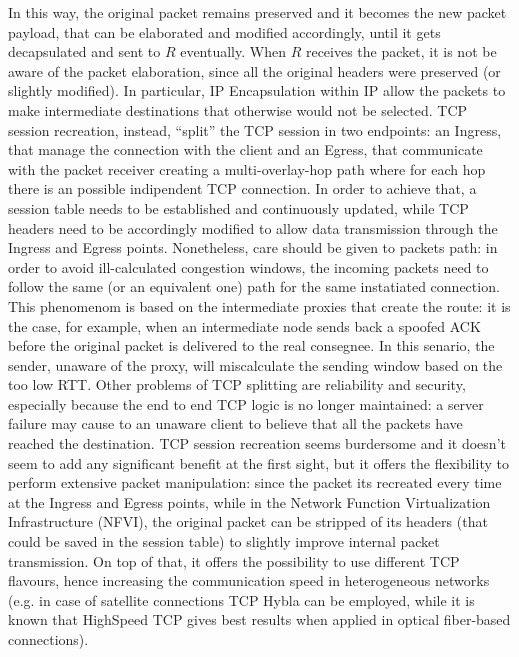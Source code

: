 \documentclass[10pt]{book}
\begin{document}
In this way, the original packet remains preserved and it becomes the new packet
payload, that can be elaborated and modified accordingly, until it gets
decapsulated and sent to $R$ eventually. When $R$ receives the packet, it is not
be aware of the packet elaboration, since all the original headers were
preserved (or slightly modified). In particular, IP Encapsulation within IP
allow the packets to make intermediate destinations that otherwise would not be
selected. TCP session recreation, instead, ``split'' the TCP session in two
endpoints: an Ingress, that manage the connection with the client and an Egress,
that communicate with the packet receiver creating a multi-overlay-hop path
where for each hop there is an possible indipendent TCP connection. In order to
achieve that, a session table needs to be established and continuously updated,
while TCP headers need to be accordingly modified to allow data transmission
through the Ingress and Egress points. Nonetheless, care should be given to
packets path: in order to avoid ill-calculated congestion windows, the incoming
packets need to follow the same (or an equivalent one) path for the same
instatiated connection. This phenomenom is based on the intermediate proxies
that create the route: it is the case, for example, when an intermediate node
sends back a spoofed ACK before the original packet is delivered to the real
consegnee. In this senario, the sender, unaware of the proxy, will miscalculate
the sending window based on the too low RTT. Other problems of TCP splitting are
reliability and security, especially because the end to end TCP logic is no
longer maintained: a server failure may cause to an unaware client to believe
that all the packets have reached the destination. TCP session recreation seems
burdersome and it doesn't seem to add any significant benefit at the first
sight, but it offers the flexibility to perform extensive packet manipulation:
since the packet its recreated every time at the Ingress and Egress points,
while in the Network Function Virtualization Infrastructure (NFVI), the original
packet can be stripped of its headers (that could be saved in the session table)
to slightly improve internal packet transmission.  On top of that, it offers the possibility to use different
TCP flavours, hence increasing the communication speed in heterogeneous networks
(e.g. in case of satellite connections TCP Hybla can be employed, while it is
known that HighSpeed TCP gives best results when applied in optical fiber-based
connections).
\end{document}
